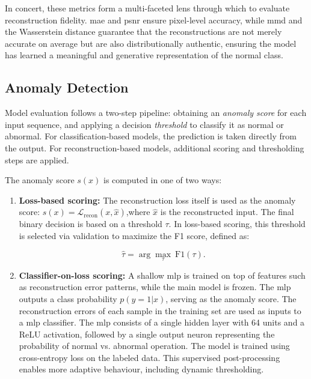 In concert, these metrics form a multi-faceted lens through which to evaluate reconstruction fidelity. \gls{mae} and \gls{psnr} ensure pixel-level accuracy, while \gls{mmd} and the Wasserstein distance guarantee that the reconstructions are not merely accurate on average but are also distributionally authentic, ensuring the model has learned a meaningful and generative representation of the normal class.


\subsection{Anomaly Detection}
\label{subsec:abn-detection-eval}
Model evaluation follows a two-step pipeline: obtaining an \emph{anomaly score} for each input sequence, and applying a decision \emph{threshold} to classify it as normal or abnormal.
For classification-based models, the prediction is taken directly from the output.
For reconstruction-based models, additional scoring and thresholding steps are applied.

The anomaly score $s(x)$ is computed in one of two ways:

\begin{enumerate}
\item \textbf{Loss-based scoring:}
The reconstruction loss itself is used as the anomaly score: $s(x) = \mathcal{L}_{\text{recon}}(x, \hat{x})$,where $\hat{x}$ is the reconstructed input.
The final binary decision is based on a threshold $\tau$.
In loss-based scoring, this threshold is selected via validation to maximize the F1 score, defined as:

\begin{equation}
\label{eq:f1-threshold}
\hat{\tau} = \arg\max_{\tau} \ \mathrm{F1}(\tau).
\end{equation}

\item \textbf{Classifier-on-loss scoring:}  
A shallow \gls{mlp} is trained on top of features such as reconstruction error patterns, while the main model is frozen.
The \gls{mlp} outputs a class probability \( p(y=1|x) \), serving as the anomaly score.
The reconstruction errors of each sample in the training set are used as inputs to a \gls{mlp} classifier.
The \gls{mlp} consists of a single hidden layer with 64 units and a ReLU activation, followed by a single output neuron representing the probability of normal vs. abnormal operation.
The model is trained using cross-entropy loss on the labeled data.
This supervised post-processing enables more adaptive behaviour, including dynamic thresholding.

\end{enumerate}

